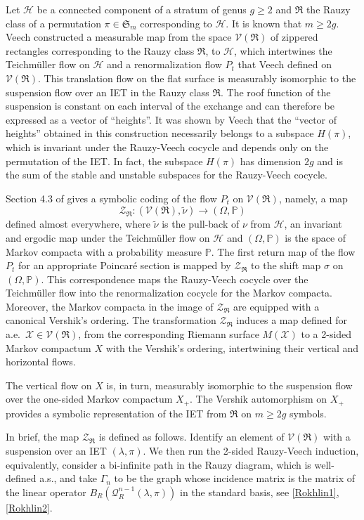 \documentclass[10pt]{amsart}
\let\mathcal\mathscr
\theoremstyle{plain}
\theoremstyle{definition}
\let\wt\widetilde
\let\lam\lambda
\let\Om\Omega
\let\Gam\Gamma
\newcommand\FrR{\mathfrak{R}}
\newcommand\Frs{\mathfrak{S}}
\newcommand\Hk{\mathcal{H}}
\newcommand\Qk{\mathcal{Q}}
\newcommand\Vk{\mathcal{V}}
\newcommand\Xk{\mathcal{X}}
\newcommand\Zk{\mathcal{Z}}
\renewcommand{\P}{\mathbb{P}}
\newcommand\be{\begin{equation}}
\newcommand\ee{\end{equation}}
\begin{document}
Let $\Hk$ be a connected component of a stratum of genus $g\ge 2$ and $\FrR$ the Rauzy class of a permutation $\pi\in \Frs_m$ corresponding to $\Hk$. It is known that $m\ge 2g$.
Veech \cite{veech}
constructed a measurable map from the space $\Vk(\FrR)$ of
zippered rectangles corresponding to the Rauzy class $\FrR$, to $\Hk$, which intertwines the Teichmüller flow on $\Hk$ and a renormalization flow $P_t$ that Veech defined on $\Vk(\FrR)$. This translation flow on the flat surface is measurably isomorphic to the suspension flow over an IET in the Rauzy class $\FrR$. The roof function of the suspension is constant on each interval of the exchange and can therefore be expressed as a vector of ``heights''.
It was shown by Veech \cite{veechamj} that the ``vector of heights'' obtained in this construction necessarily belongs to a subspace $H(\pi)$, which is invariant under the Rauzy-Veech cocycle and depends only on the permutation of the IET. In fact, the subspace $H(\pi)$ has dimension $2g$ and is the sum of the stable and unstable subspaces for the Rauzy-Veech cocycle.

Section 4.3 of \cite{Buf-umn} gives a symbolic coding of the flow $P_t$ on $\Vk(\FrR)$, namely, a map
\be \label{map-veech}
\Zk_{\FrR}: (\Vk(\FrR),\wt\nu) \to (\Om,\P)
\ee
defined almost everywhere, where $\wt\nu$ is the pull-back of $\nu$ from $\Hk$, an invariant and ergodic map under the Teichmüller flow on
$\Hk$ and $(\Om,\P)$ is the space of Markov compacta with a probability measure $\P$.
The first return map of the flow $P_t$ for an appropriate Poincaré section is mapped by $\Zk_\FrR$ to the shift map $\sigma$ on $(\Om,\P)$. This correspondence maps the Rauzy-Veech cocycle over the Teichmüller flow into the renormalization cocycle for the Markov compacta. Moreover, the Markov compacta in the image of $\Zk_{\FrR}$ are equipped with a
canonical Vershik's ordering.
The transformation $\Zk_\FrR$ induces a map defined for a.e.\ $\Xk\in \Vk(\FrR)$, from the corresponding Riemann surface $M(\Xk)$ to a 2-sided Markov compactum $X$ with the Vershik's ordering, intertwining their vertical and horizontal flows.

The vertical flow on $X$ is, in turn, measurably isomorphic to the suspension flow over the one-sided Markov compactum $X_+$. The Vershik automorphism on $X_+$ provides a symbolic representation of the IET from $\FrR$ on $m\ge 2g$ symbols.

In brief, the map $\Zk_\FrR$ is defined as follows. Identify an element of $\Vk(\FrR)$ with a suspension over an IET $(\lam,\pi)$.
We then run the 2-sided Rauzy-Veech induction, equivalently, consider a bi-infinite path in the Rauzy diagram, which is well-defined a.s., and take
$\Gam_n$ to be the graph whose incidence matrix is the matrix of the linear operator $B_R(\Qk^{n-1}_R(\lam,\pi))$ in the standard basis, see \eqref{Rokhlin1}, \eqref{Rokhlin2}.
\end{document}

